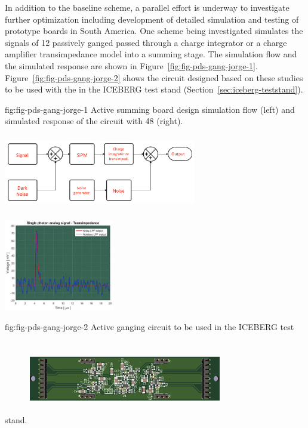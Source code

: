 
In addition to the baseline scheme, a parallel effort is underway to investigate further optimization including development of detailed simulation and testing of prototype boards in South America. One scheme being investigated simulates the signals of 12 passively ganged  passed through a charge integrator or a charge amplifier transimpedance model into a summing stage. The simulation flow and the simulated response are shown in 
Figure~\ref{fig:fig-pds-gang-jorge-1}. Figure~\ref{fig:fig-pds-gang-jorge-2} shows the circuit designed based on these studies to be used with the  in the ICEBERG test stand (Section~\ref{sec:iceberg-teststand}).

\begin{dunefigure}
 {fig:fig-pds-gang-jorge-1}
 {Active summing board design simulation flow (left) and simulated response of the circuit with 48 (right).}
\includegraphics[angle=0,width=8.4cm,height=4cm]{graphics/pds-gang-jorge-2.png}
\includegraphics[height=4cm]{graphics/pds-gang-jorge-3.png}
\end{dunefigure}

\begin{dunefigure}
 {fig:fig-pds-gang-jorge-2}
 {Active ganging circuit to be used in the ICEBERG test stand.}
\includegraphics[angle=0,width=8.4cm,height=4cm]{graphics/pds-gang-jorge-4.png}
\end{dunefigure}

